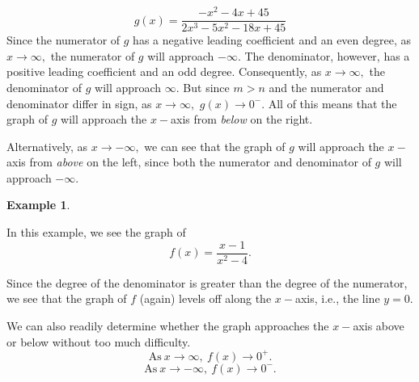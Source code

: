 \documentclass[12pt]{book}
\theoremstyle{definition}
\newtheorem{example}{Example}
\begin{document}
$$g(x)=\dfrac{-x^2-4x+45}{2x^3-5x^2-18x+45}$$
Since the numerator of $g$ has a negative leading coefficient and an even degree, as $x\rightarrow\infty,$ the numerator of $g$ will approach $-\infty$.  The denominator, however, has a positive leading coefficient and an odd degree.  Consequently, as $x\rightarrow\infty,$ the denominator of $g$ will approach $\infty$.  But since $m>n$ and the numerator and denominator differ in sign, as $x\rightarrow\infty,$ $g(x)\rightarrow 0^-$.  All of this means that the graph of $g$ will approach the $x-$axis from {\it below} on the right.
\par
Alternatively, as $x\rightarrow -\infty,$ we can see that the graph of $g$ will approach the $x-$axis from {\it above} on the left, since both the numerator and denominator of $g$ will approach $-\infty$.
\begin{example}
\begin{multicols}{2}
In this example, we see the graph of $$f(x)=\dfrac{x-1}{x^2-4}.$$
\par
Since the degree of the denominator is greater than the degree of the numerator, we see that the graph of $f$ (again) levels off along the $x-$axis, i.e., the line $y=0$.
\par
We can also readily determine whether the graph approaches the $x-$axis above or below without too much difficulty.
$$\text{As} \ x\rightarrow\infty, \ f(x)\rightarrow 0^+.$$
$$\text{As} \ x\rightarrow-\infty, \ f(x)\rightarrow 0^-.$$

\columnbreak


\end{multicols}
\end{example}
\end{document}

